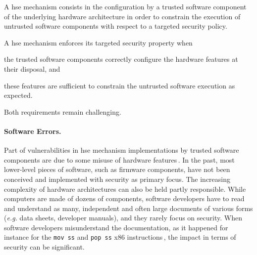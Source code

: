 \begin{definition}
  A \ac{hse} mechanism consists in the configuration by a trusted software
  component of the underlying hardware architecture in order to constrain the
  execution of untrusted software components with respect to a targeted security
  policy.
\end{definition}

A \ac{hse} mechanism enforces its targeted security property when
%
\begin{inparaenum}[(1)]
\item the trusted software components correctly configure the hardware features
  at their disposal, and
%
\item these features are sufficient to constrain the untrusted software
  execution as expected.
\end{inparaenum}
%
Both requirements remain challenging.

\paragraph{Software Errors.}
%
Part of vulnerabilities in \ac{hse} mechanism implementations by trusted
software components are due to some misuse of hardware
features\,\cite{bulygin2014summary}.
%
In the past, most lower-level pieces of software, such as firmware components,
have not been conceived and implemented with security as primary focus.
%
The increasing complexity of hardware architectures can also be held partly
responsible.
%
While computers are made of dozens of components, software developers have to
read and understand as many, independent and often large documents of various
forms (\emph{e.g.} data sheets, developer manuals), and they rarely focus on
security.
%
When software developers misunderstand the documentation, as it happened for
instance for the \texttt{mov ss} and \texttt{pop ss} x86
instructions\,\cite{movsspopss}, the impact in terms of security can be
significant.

